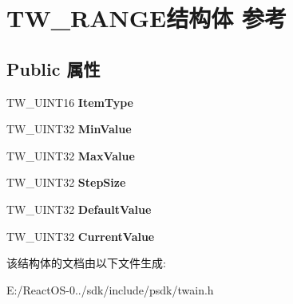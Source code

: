\hypertarget{struct_t_w___r_a_n_g_e}{}\section{T\+W\+\_\+\+R\+A\+N\+G\+E结构体 参考}
\label{struct_t_w___r_a_n_g_e}
\subsection*{Public 属性}
\begin{DoxyCompactItemize}
\item 
\mbox{\label{struct_t_w___r_a_n_g_e_aac27ec7f213ef90e08df04eaf604fe8f}} 
T\+W\+\_\+\+U\+I\+N\+T16 {\bfseries Item\+Type}
\item 
\mbox{\label{struct_t_w___r_a_n_g_e_aaf37154322f2900fc05e8ddd60cf2db2}} 
T\+W\+\_\+\+U\+I\+N\+T32 {\bfseries Min\+Value}
\item 
\mbox{\label{struct_t_w___r_a_n_g_e_a594ff066d5cf8eece320d5165f44c07c}} 
T\+W\+\_\+\+U\+I\+N\+T32 {\bfseries Max\+Value}
\item 
\mbox{\label{struct_t_w___r_a_n_g_e_ab1a185d8ceafd5e4b1e3dafbd6a47bd4}} 
T\+W\+\_\+\+U\+I\+N\+T32 {\bfseries Step\+Size}
\item 
\mbox{\label{struct_t_w___r_a_n_g_e_a0884ef6a9e660c1791a13f0bf315b3e0}} 
T\+W\+\_\+\+U\+I\+N\+T32 {\bfseries Default\+Value}
\item 
\mbox{\label{struct_t_w___r_a_n_g_e_ab394be86285e44c3b76e2ab7e69180df}} 
T\+W\+\_\+\+U\+I\+N\+T32 {\bfseries Current\+Value}
\end{DoxyCompactItemize}


该结构体的文档由以下文件生成\+:\begin{DoxyCompactItemize}
\item 
E\+:/\+React\+O\+S-\/0../sdk/include/psdk/twain.\+h\end{DoxyCompactItemize}
